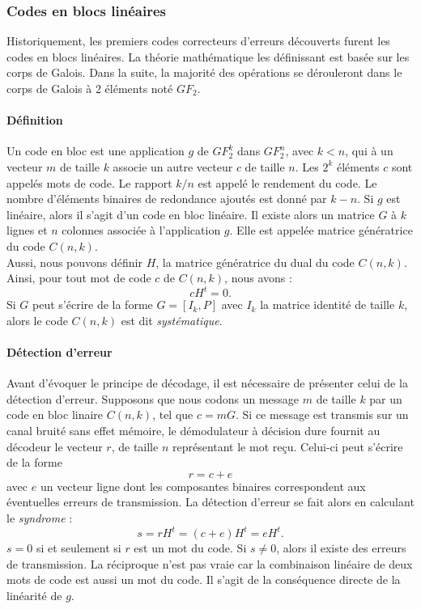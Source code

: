 \subsubsection{Codes en blocs linéaires}
Historiquement, les premiers codes correcteurs d'erreurs découverts furent les codes en blocs linéaires. La théorie 
mathématique les définissant est basée sur les corps de Galois. Dans la suite, la majorité des opérations se dérouleront 
dans le corps de Galois à 2 éléments noté $GF_2$.
\paragraph*{Définition}
Un code en bloc est une application $g$ de $GF_2^k$ dans $GF_2^n$, avec $k<n$, qui à un vecteur $m$ de taille $k$ associe
un autre vecteur $c$ de taille $n$. Les $2^k$ éléments $c$ sont appelés mots de code. Le rapport $k/n$  est appelé le 
rendement du code. Le nombre d'éléments binaires de redondance ajoutés est donné par $k-n$. Si $g$ est linéaire, alors 
il s'agit d'un code en bloc linéaire. Il existe alors un matrice $G$ à $k$ lignes et $n$ colonnes associée à 
l'application $g$. Elle est appelée matrice génératrice du code $C(n,k)$. \\
Aussi, nous pouvons définir $H$, la matrice génératrice du dual du code $C(n,k)$. Ainsi, pour tout mot de code $c$ de 
$C(n,k)$, nous avons : \[cH^t = 0.\]
Si $G$ peut s'écrire de la forme $G=[I_k,P]$ avec $I_k$ la matrice identité de taille $k$, alors  le code $C(n,k)$ est dit
\emph{systématique}.
\paragraph*{Détection d'erreur}
Avant d'évoquer le principe de décodage, il est nécessaire de présenter celui de la détection d'erreur. Supposons que 
nous codons un message $m$ de taille $k$ par un code en bloc linaire $C(n,k)$, tel que $c = mG$. Si ce message est 
transmis sur un canal bruité sans effet mémoire, le démodulateur à décision dure fournit au décodeur le vecteur $r$, de 
taille $n$ représentant le mot reçu. Celui-ci peut s'écrire de la forme \[r=c+e\] avec $e$
un vecteur ligne dont les composantes binaires correspondent aux éventuelles erreurs de transmission. La détection 
d'erreur se fait alors en calculant le \emph{syndrome} : \[s = rH^t = (c+e)H^t = eH^t.\]
$s=0$ si et seulement si $r$  est un mot du code. Si $s \ne 0$, alors il existe des erreurs de transmission. La 
réciproque n'est pas vraie car la combinaison linéaire de deux mots de code est aussi un mot du code. Il s'agit de la 
conséquence directe de la linéarité de $g$.
